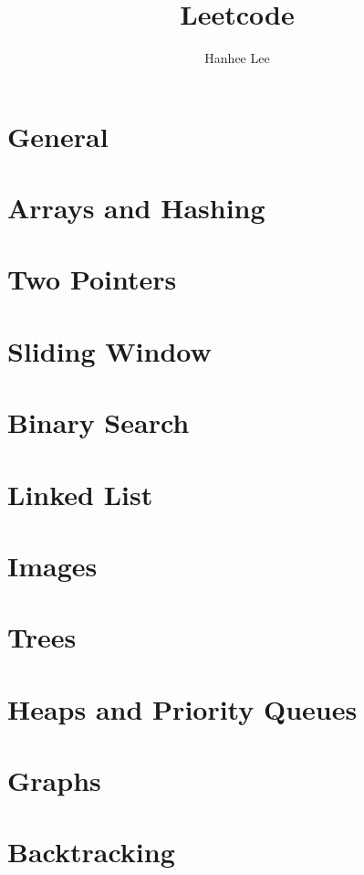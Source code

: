 \documentclass{article}
\title{Leetcode}
\author{Hanhee Lee}
\begin{document}
\maketitle

\tableofcontents
\newpage

\section{General}

\newpage

\section{Arrays and Hashing}

\newpage

\section{Two Pointers}

\newpage

\section{Sliding Window}

\newpage

\section{Binary Search}

\newpage

\section{Linked List}

\newpage

\section{Images}

\newpage

\section{Trees}

\newpage

\section{Heaps and Priority Queues}

\newpage

\section{Graphs}

\newpage

\section{Backtracking}

\newpage
\end{document}
